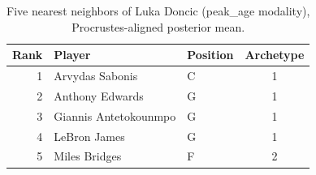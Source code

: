 \begin{table}[htbp]
  \centering\small
  \begin{tabular}{rllc}
    \toprule
    Rank & Player & Position & Archetype \\
    \midrule
    1 & Arvydas Sabonis & C & 1 \\
    2 & Anthony Edwards & G & 1 \\
    3 & Giannis Antetokounmpo & G & 1 \\
    4 & LeBron James & G & 1 \\
    5 & Miles Bridges & F & 2 \\
    \bottomrule
  \end{tabular}
  \caption{Five nearest neighbors of Luka Doncic (peak_age modality), Procrustes-aligned posterior mean.}
  \label{tab:Luka_Doncic_neighbors_peak_age}
\end{table}

